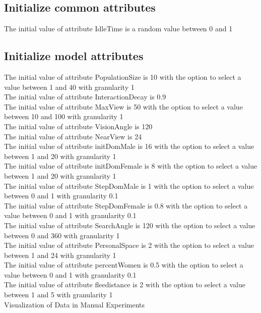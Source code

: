 \documentclass{article}
\begin{document}
\subsection{Initialize common attributes}                                                                      
The initial value of attribute {\color{blue}IdleTime} is a random value between 0 and 1

\subsection{Initialize model attributes}
The initial value of attribute {\color{blue}PopulationSize} is 10 with the option to select a value between 1 and 40 with granularity 1\\
The initial value of attribute {\color{blue}InteractionDecay} is 0.9\\                                                    
The initial value of attribute {\color{blue}MaxView} is 50 with the option to select a value between 10 and 100 with granularity 1\\      
The initial value of attribute {\color{blue}VisionAngle} is 120\\    
The initial value of attribute {\color{blue}NearView} is 24\\                                                                       
The initial value of attribute {\color{blue}initDomMale} is 16 with the option to select a value between 1 and 20 with granularity 1\\
The initial value of attribute {\color{blue}initDomFemale} is 8 with the option to select a value between 1 and 20 with granularity 1\\  
The initial value of attribute {\color{blue}StepDomMale} is 1 with the option to select a value between 0 and 1 with granularity 0.1\\ 
The initial value of attribute {\color{blue}StepDomFemale} is 0.8 with the option to select a value between 0 and 1 with granularity 0.1\\
The initial value of attribute {\color{blue}SearchAngle} is 120 with the option to select a value between 0 and 360 with granularity 1\\
The initial value of attribute {\color{blue}PersonalSpace} is 2 with the option to select a value between 1 and 24 with granularity 1\\ 
The initial value of attribute {\color{blue}percentWomen} is 0.5 with the option to select a value between 0 and 1 with granularity 0.1\\
The initial value of attribute {\color{blue}fleedistance} is 2 with the option to select a value between 1 and 5 with granularity 1\\
Visualization of Data in Manual Experiments\\                                  
\end{document}
